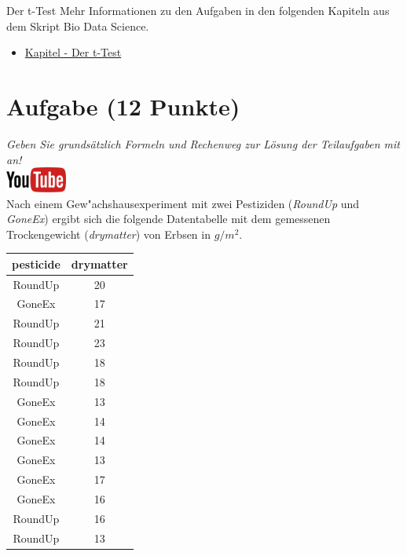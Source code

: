 \documentclass[a4paper, 9pt]{scrartcl}\usepackage[]{graphicx}\usepackage[]{xcolor}
\begin{document}
\clearpage
\begin{graybox}{Der t-Test}
Mehr Informationen zu den Aufgaben in den folgenden Kapiteln aus dem Skript Bio Data Science.
  \begin{itemize}
  \item \href{https://jkruppa.github.io/stat-tests-ttest.html}{Kapitel - Der t-Test}
  \end{itemize}
\end{graybox}
\clearpage

\section{Aufgabe \hfill (12 Punkte)}

\textit{Geben Sie grunds{\"a}tzlich Formeln und Rechenweg zur L{\"o}sung der
  Teilaufgaben mit an!} \\[1Ex]

\hfill\href{https://youtu.be/Cq_rF_z4xOk}{\includegraphics[width =
  2cm]{img/youtube}}\\[1Ex]



Nach einem Gew{"a}chshausexperiment mit zwei Pestiziden (\textit{RoundUp} und
\textit{GoneEx}) ergibt sich die folgende Datentabelle mit dem gemessenen
Trockengewicht (\textit{drymatter}) von Erbsen in $g/m^2$.

\begin{table}[!h]
\centering
\begin{tabular}{cc}
\toprule
pesticide & drymatter\\
\midrule
RoundUp & 20\\
GoneEx & 17\\
RoundUp & 21\\
RoundUp & 23\\
RoundUp & 18\\
\addlinespace
RoundUp & 18\\
GoneEx & 13\\
GoneEx & 14\\
GoneEx & 14\\
GoneEx & 13\\
\addlinespace
GoneEx & 17\\
GoneEx & 16\\
RoundUp & 16\\
RoundUp & 13\\
\bottomrule
\end{tabular}
\end{table}
\end{document}
